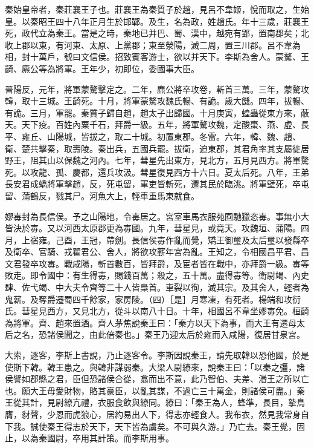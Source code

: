 
\begin{pinyinscope}
秦始皇帝者，秦莊襄王子也。莊襄王為秦質子於趙，見呂不韋姬，悅而取之，生始皇。以秦昭王四十八年正月生於邯鄲。及生，名為政，姓趙氏。年十三歲，莊襄王死，政代立為秦王。當是之時，秦地已并巴、蜀、漢中，越宛有郢，置南郡矣；北收上郡以東，有河東、太原、上黨郡；東至滎陽，滅二周，置三川郡。呂不韋為相，封十萬戶，號曰文信侯。招致賓客游士，欲以并天下。李斯為舍人。蒙驁、王齮、麃公等為將軍。王年少，初即位，委國事大臣。

晉陽反，元年，將軍蒙驁擊定之。二年，麃公將卒攻卷，斬首三萬。三年，蒙驁攻韓，取十三城。王齮死。十月，將軍蒙驁攻魏氏暢、有詭。歲大饑。四年，拔暢、有詭。三月，軍罷。秦質子歸自趙，趙太子出歸國。十月庚寅，蝗蟲從東方來，蔽天。天下疫。百姓內粟千石，拜爵一級。五年，將軍驁攻魏，定酸棗、燕、虛、長平、雍丘、山陽城，皆拔之，取二十城。初置東郡。冬雷。六年，韓、魏、趙、衛、楚共擊秦，取壽陵。秦出兵，五國兵罷。拔衛，迫東郡，其君角率其支屬徙居野王，阻其山以保魏之河內。七年，彗星先出東方，見北方，五月見西方。將軍驁死。以攻龍、孤、慶都，還兵攻汲。彗星復見西方十六日。夏太后死。八年，王弟長安君成蟜將軍擊趙，反，死屯留，軍吏皆斬死，遷其民於臨洮。將軍壁死，卒屯留、蒲鶴反，戮其尸。河魚大上，輕車重馬東就食。

嫪毐封為長信侯。予之山陽地，令毐居之。宮室車馬衣服苑囿馳獵恣毐。事無小大皆決於毐。又以河西太原郡更為毐國。九年，彗星見，或竟天。攻魏垣、蒲陽。四月，上宿雍。己酉，王冠，帶劍。長信侯毐作亂而覺，矯王御璽及太后璽以發縣卒及衛卒、官騎、戎翟君公、舍人，將欲攻蘄年宮為亂。王知之，令相國昌平君、昌文君發卒攻毐。戰咸陽，斬首數百，皆拜爵，及宦者皆在戰中，亦拜爵一級。毐等敗走。即令國中：有生得毐，賜錢百萬；殺之，五十萬。盡得毐等。衛尉竭、內史肆、佐弋竭、中大夫令齊等二十人皆梟首。車裂以徇，滅其宗。及其舍人，輕者為鬼薪。及奪爵遷蜀四千餘家，家房陵。（四）［是］月寒凍，有死者。楊端和攻衍氏。彗星見西方，又見北方，從斗以南八十日。十年，相國呂不韋坐嫪毐免。桓齮為將軍。齊、趙來置酒。齊人茅焦說秦王曰：「秦方以天下為事，而大王有遷母太后之名，恐諸侯聞之，由此倍秦也。」秦王乃迎太后於雍而入咸陽，復居甘泉宮。

大索，逐客，李斯上書說，乃止逐客令。李斯因說秦王，請先取韓以恐他國，於是使斯下韓。韓王患之。與韓非謀弱秦。大梁人尉繚來，說秦王曰：「以秦之彊，諸侯譬如郡縣之君，臣但恐諸侯合從，翕而出不意，此乃智伯、夫差、湣王之所以亡也。願大王毋愛財物，賂其豪臣，以亂其謀，不過亡三十萬金，則諸侯可盡。」秦王從其計，見尉繚亢禮，衣服食飲與繚同。繚曰：「秦王為人，蜂準，長目，摯鳥膺，豺聲，少恩而虎狼心，居約易出人下，得志亦輕食人。我布衣，然見我常身自下我。誠使秦王得志於天下，天下皆為虜矣。不可與久游。」乃亡去。秦王覺，固止，以為秦國尉，卒用其計策。而李斯用事。


\end{pinyinscope}

